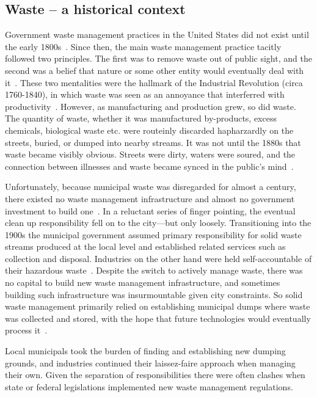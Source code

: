 \documentclass[../main/main]{subfiles}
\begin{document}
\subsection{Waste -- a historical context}
Government waste management practices in the United States did not exist until the early 1800s~\cite{elliott2013}. Since then, the main waste management practice tacitly followed two principles. The first was to remove waste out of public sight, and the second was a belief that nature or some other entity would eventually deal with it~\cite{elliott2013}. These two mentalities were the hallmark of the Industrial Revolution (circa 1760-1840), in which waste was seen as an annoyance that interferred with productivity~\cite{williammcdonough1998}. However, as manufacturing and production grew, so did waste. The quantity of waste, whether it was manufactured by-products, excess chemicals, biological waste etc. were routeinly discarded hapharzardly on the streets, buried, or dumped into nearby streams. It was not until the 1880s that waste became visibly obvious. Streets were dirty, waters were soured, and the connection between illnesses and waste became synced in the public's mind~\cite{louis2004}.

Unfortunately, because municipal waste was disregarded for almost a century, there existed no waste management infrastructure and almost no government investment to build one~\cite{elliott2013}. In a reluctant series of finger pointing, the eventual clean up responsibility fell on to the city---but only loosely. Transitioning into the 1900s the municipal government assumed primary responsibility for solid waste streams produced at the local level and established related services such as collection and disposal. Industries on the other hand were held self-accountable of their hazardous waste~\cite{elliott2013}.
Despite the switch to actively manage waste, there was no capital to build new waste management infrastructure, and sometimes building such infrastructure was insurmountable given city constraints. So solid waste management primarily relied on establishing municipal dumps where waste was collected and stored, with the hope that future technologies would eventually process it~\cite{louis2004,elliott2013}.

Local municipals took the burden of finding and establishing new dumping grounds, and industries continued their laissez-faire approach when managing their own. Given the separation of responsibilities there were often clashes when state or federal legislations implemented new waste management regulations. %
\end{document}
